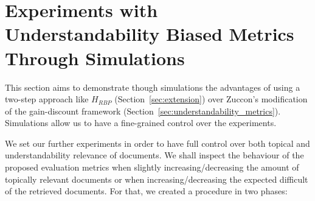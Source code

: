 
\section{Experiments with Understandability Biased Metrics Through Simulations}
\label{sec:simulations}


This section aims to demonstrate though simulations the advantages of using a two-step approach like $H_{RBP}$ (Section~\ref{sec:extension}) over Zuccon's modification of the gain-discount framework (Section~\ref{sec:understandability_metrics}). Simulations allow us to have a fine-grained control over the experiments. 

We set our further experiments in order to have full control over both topical and understandability relevance of documents. We shall inspect the behaviour of the proposed evaluation metrics when slightly increasing/decreasing the amount of topically relevant documents or when increasing/decreasing the expected difficult of the retrieved documents. 
For that, we created a procedure in two phases:

